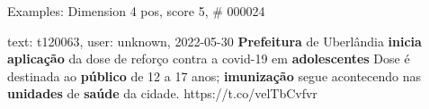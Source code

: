 \begin{frame}{Examples: Dimension 4 pos, score 5, \# 000024}
\footnotesize
\begin{exampleblock}{text: t120063, user: unknown, 2022-05-30}
\textbf{Prefeitura} de Uberlândia \textbf{inicia} \textbf{aplicação} da dose de 
reforço contra a covid-19 em \textbf{adolescentes} Dose é destinada ao 
\textbf{público} de 12 a 17 anos; \textbf{imunização} segue acontecendo nas 
\textbf{unidades} de \textbf{saúde} da cidade. https://t.co/velTbCvfvr 
\end{exampleblock}
\end{frame}
